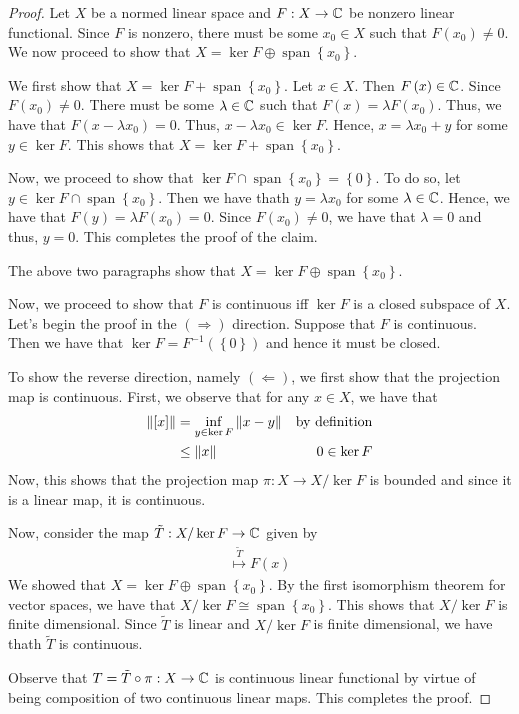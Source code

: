 \begin{proof}
    Let $X$ be a normed linear space and $F: X \to \mathbb C$ be nonzero linear functional. Since $F$ is nonzero, there must be some $x_{0} \in X$ such that $F\left( x_{0} \right) \ne 0$. We now proceed to show that $X=\ker F \oplus \operatorname{span} \left\{ x_{0} \right\}$.

    We first show that $X=\ker F + \operatorname {span} \left\{ x_{0} \right\}$. Let $x\in X$. Then $F\left( x \right) \in \mathbb C$. Since $F\left( x_{0} \right) \ne 0$. There must be some $\lambda \in \mathbb C$ such that $F\left( x \right) = \lambda F \left( x_{0} \right)$. Thus, we have that $F\left( x-\lambda x_{0} \right) = 0$. Thus, $x-\lambda x_{0}  \in \ker F$. Hence, $x= \lambda x_{0} + y$ for some $y \in \ker F$. This shows that $X=\ker F + \operatorname{span} \left\{ x_{0} \right\}$. 

    Now, we proceed to show that $\ker F \cap \operatorname{span} \left\{ x_{0} \right\} = \left\{ 0 \right\}$. To do so, let $y\in \ker F \cap \operatorname{span } \left\{ x_{0} \right\}$. Then we have thath $y= \lambda x_{0}$ for some $\lambda \in \mathbb C$. Hence, we have that $F\left( y \right) = \lambda F\left( x_{0} \right) = 0$. Since $F\left( x_0 \right) \ne 0$, we have that $\lambda = 0$ and thus, $y=0$. This completes the proof of the claim.

    The above two paragraphs show that $X = \ker F \oplus \operatorname{span} \left\{ x_{0} \right\}$.

    Now, we proceed to show that $F$ is continuous iff $\ker F$ is a closed subspace of $X$. Let's begin the proof in the $\left( \Rightarrow \right)$ direction. Suppose that $F$ is continuous. Then we have that $\ker F = F^{-1} \left( \left\{ 0 \right\} \right)$ and hence it must be closed.
    
    To show the reverse direction, namely $\left( \Leftarrow \right)$, we first show that the projection map is continuous. First, we observe that for any $x\in X$, we have that
    \begin{align*}
	\left\lVert [x] \right\rVert &= \inf_{y\in \ker F} \left\lVert x-y \right\rVert & \text{by definition} \\
	&\le \left\lVert x \right\rVert & 0 \in \ker F
    \end{align*}
    Now, this shows that the projection map $\pi : X \to X/\ker F$ is bounded and since it is a linear map, it is continuous.

    Now, consider the map $\tilde{T} : X / \ker F \to \mathbb C$ given by
    \begin{align*}
	[x] \stackrel{\tilde{T}}{\mapsto} F\left( x \right)
    \end{align*}
    We showed that $X= \ker F \oplus \operatorname{span} \left\{ x_{0} \right\}$. By the first isomorphism theorem for vector spaces, we have that $X/\ker F \cong \operatorname{span} \left\{ x_{0} \right\}$. This shows that $X/\ker F$ is finite dimensional. Since $\tilde{T}$ is linear and $X/\ker F$ is finite dimensional, we have thath $\tilde{T}$ is continuous.

    Observe that $T = \tilde{T} \circ \pi : X \to \mathbb C$ is continuous linear functional by virtue of being composition of two continuous linear maps. This completes the proof.
\end{proof}
